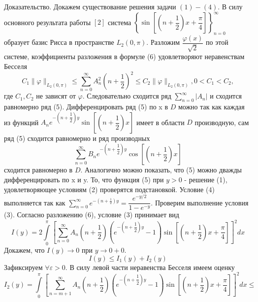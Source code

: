 \documentclass[a4paper, 9pt]{article}
\begin{document}
	\par
	Доказательство. Докажем существование решения задачи $(1) - (4)$. В силу основного результата работы $[2]$ система  $\left\{\sin{\left[\left(n + \dfrac12\right)x + \dfrac\pi4\right]}\right\}_{n=0}^{\infty}$ образует базис Рисса в пространстве $L_2(0, \pi)$. Разложим $\dfrac{\varphi(x)}{\sqrt2}$ по этой системе, коэффициенты разложения в формуле (6) удовлетворяют неравенствам Бесселя
	\begin{equation*}
		C_1 \|\varphi \|_{L_2(0,\pi)} \leq \sum\limits_{n=0}^{\infty} A_n^2 \left(n + \dfrac12\right)^2 \leq C_2 \|\varphi \|_{L_2(0,\pi)} , 0 < C_1 < C_2, 
	\end{equation*}
	где $C_1, C_2$ не зависят от $\varphi$. Следовательно сходится ряд $\sum\limits_{n=0}^{\infty} |A_n|$ и сходится равномерно ряд (5). Дифференцировать ряд (5) по x в $D$ можно так как каждая из функций $A_n e^{-\left(n + \dfrac12\right)y} \sin{\left[\left(n + \dfrac12\right)x\right]}$ имеет в области $D$ производную, сам ряд (5) сходится равномерно и ряд производных 
	\begin{equation*}
		\sum\limits_{n=0}^{\infty} B_n e^{-\left(n + \dfrac12\right)y} \cos{\left[\left(n + \dfrac12\right)x\right]}
	\end{equation*}
	 сходится равномерно в $D$. Аналогично можно показать, что (5) можно дважды дифференцировать по x и y. То, что функция (5) при $y>0$ - решение (1), удовлетворяющее условиям (2) проверятся подстановкой. Условие (4) выполняется так как  $\sum\limits_{n=0}^{\infty} e^{-\left(n + \frac12\right)y} = \dfrac{e^{-y/2}}{1 - e^{-y}}$. Проверим выполнение условия (3).\newline
	Согласно разложению (6), условие (3) принимает вид
	\begin{equation*}
		I(y) =  2 \int\limits_0^\pi \left[	\sum\limits_{n=0}^{\infty} A_n\left(n+\dfrac12\right) \left( e^{-\left(n+\dfrac12\right)y} - 1\right) \sin{\left[\left(n+\dfrac12\right) x  + \dfrac\pi4\right]} \right]^2 dx
	\end{equation*}
	Докажем, что $I(y) \to 0$ при $y \to 0+0$. 
	\begin{equation*}
		I(y) \leq I_1(y) + I_2(y)
	\end{equation*}
	Зафиксируем  $\forall \varepsilon > 0$. В силу левой части неравенства Бесселя имеем оценку
	\begin{equation*}
		I_2(y) =  \int\limits_0^\pi \left[	\sum\limits_{n=m+1}^{\infty} A_n\left(n+\dfrac12\right) \left( e^{-\left(n+\dfrac12\right)y} - 1\right) \sin{\left[\left(n+\dfrac12\right) x  + \dfrac\pi4\right]} \right]^2 dx \leq 
	\end{equation*}
\end{document}
